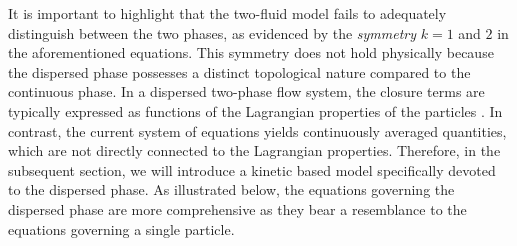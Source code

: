 It is important to highlight that the two-fluid model fails to adequately distinguish between the two phases, as evidenced by the \textit{symmetry} $k = 1$ and $2$ in the aforementioned equations. This symmetry does not hold physically because the dispersed phase possesses a distinct topological nature compared to the continuous phase. 
In a dispersed two-phase flow system, the closure terms are typically expressed as functions of the Lagrangian properties of the particles \citep{jackson2000}. In contrast, the current system of equations yields continuously averaged quantities, which are not directly connected to the Lagrangian properties.
Therefore, in the subsequent section, we will introduce a kinetic based model specifically devoted to the dispersed phase. 
As illustrated below, the equations governing the dispersed phase are more comprehensive as they bear a resemblance to the equations governing a single particle.

